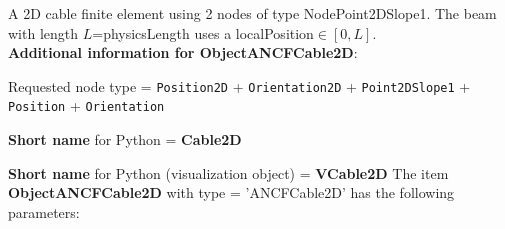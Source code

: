 %
\newpage

\label{sec:item:ObjectANCFCable2D}
A 2D cable finite element using 2 nodes of type NodePoint2DSlope1. The beam with length $L$=physicsLength uses a localPosition$\in [0, L]$.\vspace{12pt}
 \\{\bf Additional information for ObjectANCFCable2D}:
\bi
  \item Requested node type = \texttt{Position2D} + \texttt{Orientation2D} + \texttt{Point2DSlope1} + \texttt{Position} + \texttt{Orientation}
  \item {\bf Short name} for Python = {\bf Cable2D}  \item {\bf Short name} for Python (visualization object) = {\bf VCable2D}\ei
\vspace{12pt} \noindent The item {\bf ObjectANCFCable2D} with type = 'ANCFCable2D' has the following parameters:\vspace{-1cm}\\ 
